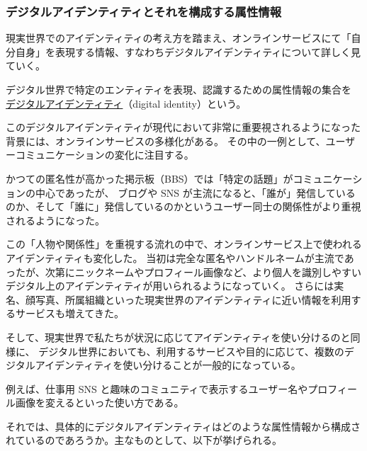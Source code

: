\documentclass[uplatex]{jsarticle}
\def\label#1{}%
\begin{document}
\subsubsection{デジタルアイデンティティとそれを構成する属性情報}

現実世界でのアイデンティティの考え方を踏まえ、オンラインサービスにて「自分自身」を表現する情報、すなわちデジタルアイデンティティについて詳しく見ていく。

\begin{dfn}[デジタルアイデンティティ]\label{dfn:digital-identity}
デジタル世界で特定のエンティティを表現、認識するための属性情報の集合を \underline{デジタルアイデンティティ}（digital identity）という。
\end{dfn}

このデジタルアイデンティティが現代において非常に重要視されるようになった背景には、オンラインサービスの多様化がある。
その中の一例として、ユーザーコミュニケーションの変化に注目する。

\begin{exa}[オンラインサービスのユーザーコミュニケーションの変化]\label{exa:ch1-communication-change}
かつての匿名性が高かった掲示板（BBS）では「特定の話題」がコミュニケーションの中心であったが、
ブログや SNS が主流になると、「誰が」発信しているのか、そして「誰に」発信しているのかというユーザー同士の関係性がより重視されるようになった。
\end{exa}

この「人物や関係性」を重視する流れの中で、オンラインサービス上で使われるアイデンティティも変化した。
当初は完全な匿名やハンドルネームが主流であったが、次第にニックネームやプロフィール画像など、より個人を識別しやすいデジタル上のアイデンティティが用いられるようになっていく。
さらには実名、顔写真、所属組織といった現実世界のアイデンティティに近い情報を利用するサービスも増えてきた。

そして、現実世界で私たちが状況に応じてアイデンティティを使い分けるのと同様に、
デジタル世界においても、利用するサービスや目的に応じて、複数のデジタルアイデンティティを使い分けることが一般的になっている。

\begin{exa}[デジタル世界でのアイデンティティの使い分け]\label{exa:ch1-digital-multiple-identities}
例えば、仕事用 SNS と趣味のコミュニティで表示するユーザー名やプロフィール画像を変えるといった使い方である。
\end{exa}

それでは、具体的にデジタルアイデンティティはどのような属性情報から構成されているのであろうか。主なものとして、以下が挙げられる。
\end{document}
